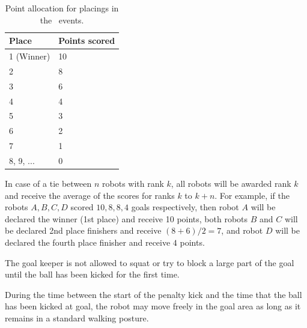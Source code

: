 \documentclass[12pt]{hurocup}
\begin{document}
\begin{lawlist}[PK]
\begin{itemize}
    \begin{table}
      \begin{center}
        \begin{tabular}{l|l}
          \hline
          Place & Points scored \\
          \hline
          1 (Winner) & 10 \\
          2          & 8 \\
          3          & 6 \\
          4          & 4 \\
          5          & 3 \\
          6          & 2 \\
          7          & 1 \\
          8, 9, ...  & 0 \\
          \hline
        \end{tabular}
      \end{center}
      \caption{Point allocation for placings in the \HuroCup\ events.}
      \label{point-allocation}
    \end{table}
 \end{itemize}

\item In case of a tie between $n$ robots with rank $k$, all robots
 will be awarded rank $k$ and receive the average of the scores for
 ranks $k$ to $k+n$.  For example, if the robots $A,B,C,D$ scored $10,
 8, 8, 4$ goals respectively, then robot $A$ will be declared the
 winner (1st place) and receive 10 points, both robots $B$ and $C$
 will be declared 2nd place finishers and receive $(8+6)/2=7$, and
 robot $D$ will be declared the fourth place finisher and receive $4$
 points.

\end{lawlist}

\begin{decisions}
\item The goal keeper is not allowed to squat or try to block a large
  part of the goal until the ball has been kicked for the first
  time. 
\item During the time between the start of the penalty kick and the
  time that the ball has been kicked at goal, the robot may move
  freely in the goal area as long as it remains in a standard walking
  posture.
\end{decisions}
\end{document}
